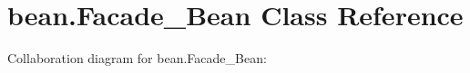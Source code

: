 \hypertarget{classbean_1_1Facade__Bean}{}\section{bean.\+Facade\+\_\+\+Bean Class Reference}
\label{classbean_1_1Facade__Bean}


Collaboration diagram for bean.\+Facade\+\_\+\+Bean\+:

